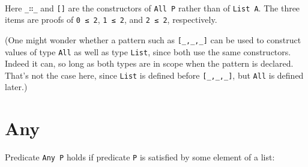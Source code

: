 \begin{fence}
\begin{code}%
\>[0]\AgdaFunction{\AgdaUnderscore{}}\AgdaSpace{}%
\AgdaSymbol{:}\AgdaSpace{}%
\AgdaSpace{}%
\AgdaSymbol{(}\AgdaSpace{}%
\AgdaSymbol{)}\AgdaSpace{}%
\AgdaOperator{\AgdaInductiveConstructor{[}}\AgdaSpace{}%
\AgdaSpace{}%
\AgdaOperator{\AgdaInductiveConstructor{,}}\AgdaSpace{}%
\AgdaSpace{}%
\AgdaOperator{\AgdaInductiveConstructor{,}}\AgdaSpace{}%
\AgdaSpace{}%
\AgdaOperator{\AgdaInductiveConstructor{]}}\<%
\\
\>[0]\AgdaSymbol{\AgdaUnderscore{}}\AgdaSpace{}%
\AgdaSymbol{=}\AgdaSpace{}%
\AgdaSpace{}%
\AgdaSpace{}%
\AgdaSpace{}%
\AgdaSpace{}%
\AgdaSpace{}%
\AgdaSpace{}%
\AgdaSymbol{(}\AgdaSpace{}%
\AgdaSymbol{)}\AgdaSpace{}%
\AgdaSpace{}%
\AgdaInductiveConstructor{[]}\<%
\end{code}
\end{fence}

Here \texttt{\_∷\_} and \texttt{{[}{]}} are the constructors of
\texttt{All\ P} rather than of \texttt{List\ A}. The three items are
proofs of \texttt{0\ ≤\ 2}, \texttt{1\ ≤\ 2}, and \texttt{2\ ≤\ 2},
respectively.

(One might wonder whether a pattern such as \texttt{{[}\_,\_,\_{]}} can
be used to construct values of type \texttt{All} as well as type
\texttt{List}, since both use the same constructors. Indeed it can, so
long as both types are in scope when the pattern is declared. That's not
the case here, since \texttt{List} is defined before
\texttt{{[}\_,\_,\_{]}}, but \texttt{All} is defined later.)

\hypertarget{any}{%
\section{Any}\label{any}}

Predicate \texttt{Any\ P} holds if predicate \texttt{P} is satisfied by
some element of a list:

